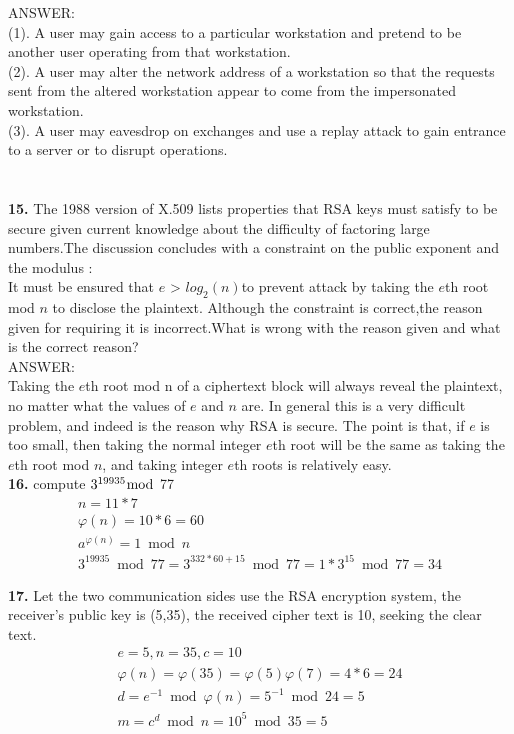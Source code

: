 \documentclass[paper=a4, fontsize=11pt]{scrartcl} %
\numberwithin{equation}{section} %
\numberwithin{figure}{section} %
\numberwithin{table}{section} %
\begin{document}
ANSWER:\\
(1). A user may gain access to a particular workstation and pretend to be another user operating from that workstation. \\
(2). A user may alter the network address of a workstation so that the requests sent from the altered workstation appear to come from the impersonated workstation. \\
(3). A user may eavesdrop on exchanges and use a replay attack to gain entrance to a server or to disrupt operations.\\
\\
\\
\textbf{15.} The 1988 version of X.509 lists properties that RSA keys must satisfy to be secure given current knowledge about the difficulty of factoring large numbers.The discussion concludes with a constraint on the public exponent and the modulus :\\
           It must be ensured that $e$ > $log_{2}(n)$to prevent attack by taking the $e$th root mod $n$ to disclose the plaintext.
Although the constraint is correct,the reason given for requiring it is incorrect.What is wrong with the reason given and what is the correct reason?\\

ANSWER:\\
Taking the $e$th root mod n of a ciphertext block will always reveal the plaintext, no matter what the values of $e$ and $n$ are. In general this is a very difficult problem, and indeed is the reason why RSA is secure. The point is that, if $e$ is too small, then taking the normal integer $e$th root will be the same as taking the $e$th root mod $n$, and taking integer $e$th roots is relatively easy.\\



\textbf{16.} compute ${3^{19935}}\bmod$ 77\\
\[\begin{array}{l}
n = 11*7\\
\varphi (n) = 10*6 = 60\\
{a^{\varphi (n)}} = 1\bmod n\\
{3^{19935}}\bmod 77 = {3^{332*60 + 15}}\bmod 77 = 1*{3^{15}}\bmod 77 = 34
\end{array}\]




\textbf{17.} Let the two communication sides use the RSA encryption system, the receiver's public key is (5,35), the received cipher text is 10, seeking the clear text.
\[\begin{array}{l}
e = 5,n = 35,c = 10\\
\varphi (n) = \varphi (35) = \varphi (5)\varphi (7) = 4*6 = 24\\
d = {e^{ - 1}}\bmod \varphi (n) = {5^{ - 1}}\bmod 24 = 5\\
m = {c^d}\bmod n = {10^5}\bmod 35 = 5
\end{array}\]
\end{document}

